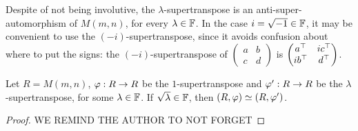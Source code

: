 \documentclass{amsbook}
\begin{document}
Despite of not being involutive, the $\lambda$-supertranspose is an anti-super-auto\-mor\-phism of $M(m,n)$, for every $\lambda \in \mathbb{F}$. In the case $i = \sqrt{-1}\in \mathbb{F}$, it may be convenient to use the $(-i)$-supertranspose, since it avoids confusion about where to put the signs: the $(-i)$-supertranspose of $\begin{pmatrix}
        a & b\\
        c & d
    \end{pmatrix}$
is $\begin{pmatrix}
        a^{\top} & i c^{\top}\\
        i b^{\top} & d^{\top}
    \end{pmatrix}$.
    
\begin{prop}\label{prop:lambda-supertransp-are-isomorphic}
    Let $R = M(m,n)$, $\varphi: R \to R$ be the $1$-supertranspose and $\varphi': R\to R$ be the $\lambda$-supertranspose, for some $\lambda \in \mathbb{F}$. If $\sqrt{\lambda}\in \mathbb{F}$, then $(R, \varphi) \simeq (R, \varphi')$.
\end{prop}

\begin{proof}
    WE REMIND THE AUTHOR TO NOT FORGET
\end{proof}






\end{document}
